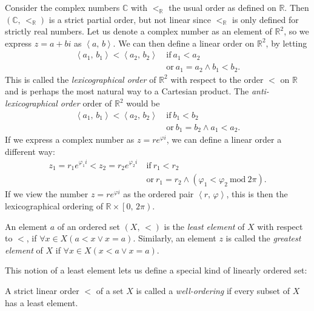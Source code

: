 \documentclass[../../main.tex]{subfiles}
\begin{document}
\begin{example}
    Consider the complex numbers $\mathbb{C}$ with $<_{\mathbb{R}}$ the usual order as defined on $\mathbb{R}$.
    Then $(\mathbb{C},\, <_{\mathbb{R}})$ is a strict partial order, but not linear since $<_{\mathbb{R}}$ is only defined for strictly real numbers.
    Let us denote a complex number as an element of $\mathbb{R}^2$, so we express $z = a + b i$ as $\left<a,\, b\right>$.
    We can then define a linear order on $\mathbb{R}^2$, by letting 
    \begin{align*}
        \left<a_1,\, b_1\right> < \left<a_2,\, b_2\right>\ &\text{if}\ a_1 < a_2 \\
        &\text{or}\ a_1 = a_2 \wedge b_1 < b_2.
    \end{align*}
    This is called the \textit{lexicographical order} of $\mathbb{R}^2$ with respect to the order $<$ on $\mathbb{R}$ and is perhaps the most natural way to a Cartesian product. \cite[p.182]{Gol17}
    The \textit{anti-lexicographical order} order of $\mathbb{R}^2$ would be 
    \begin{align*}
        \left<a_1,\, b_1\right> < \left<a_2,\, b_2\right>\ &\text{if}\ b_1 < b_2 \\
        &\text{or}\ b_1 = b_2 \wedge a_1 < a_2.
    \end{align*}
    If we express a complex number as $z = r e^{\varphi i}$, we can define a linear order a different way:
    \begin{align*}
        z_1 = r_1 e^{\varphi_1 i} < z_2 = r_2 e^{\varphi_2 i}\ &\text{if}\ r_1 < r_2 \\
        &\text{or}\ r_1 = r_2 \wedge (\varphi_1 < \varphi_2\ \text{mod}\ 2\pi).
    \end{align*}
    If we view the number $z = r e^{\varphi i}$ as the ordered pair $\left<r,\, \varphi\right>$, this is then the lexicographical ordering of $\mathbb{R} \times \left[0,\, 2 \pi\right)$.
\end{example}

\begin{definition}\cite[p.12]{Jec78}
    An element $a$ of an ordered set $\left(X,\, <\right)$ is the \textit{least element} of $X$ with respect to $<$, if $\forall x \in X  \left(a < x \vee x = a\right)$.
    Similarly, an element $z$ is called the \textit{greatest element} of $X$ if $\forall x \in X  \left(x < a \vee x = a\right)$.
\end{definition}

This notion of a least element lets us define a special kind of linearly ordered set:
\begin{definition}\cite[p.13]{Jec78}
    A strict linear order $<$ of a set $X$ is called a \textit{well-ordering} if every subset of $X$ has a least element.
\end{definition}
\end{document}
